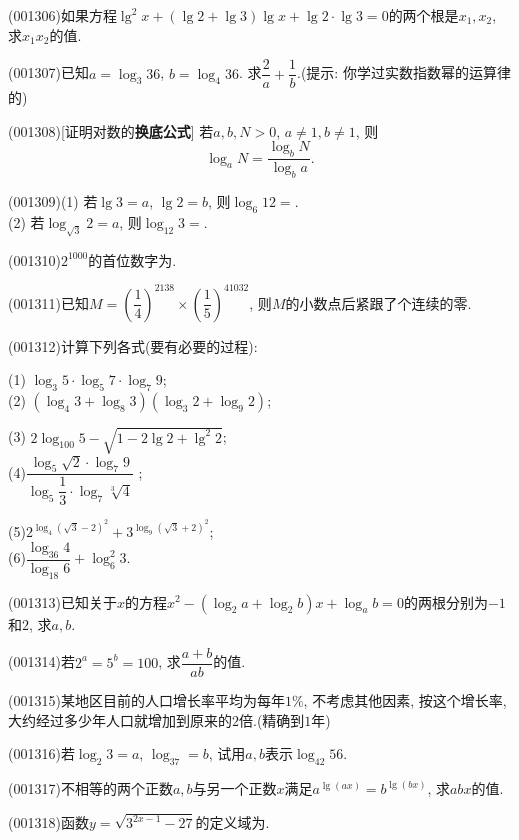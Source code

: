 \item (001306)如果方程$\lg^2x+(\lg2+\lg3)\lg x+\lg2\cdot\lg3=0$的两个根是$x_1,x_2$, 求$x_1x_2$的值.
\item (001307)已知$a=\log_3 36$, $b=\log_4 36$. 求$\dfrac{2}{a}+\dfrac{1}{b}$.(提示: 你学过实数指数幂的运算律的)
\item (001308)[证明对数的{\bf 换底公式}]
若$a,b,N>0$, $a\ne 1, b\ne 1$, 则
$$\log_aN=\dfrac{\log_b N}{\log_b a}.$$
\item (001309)(1) 若$\lg 3=a$, $\lg 2=b$, 则$\log_6 12=$.\\ 
(2) 若$\log_{\sqrt{3}} 2=a$, 则$\log_{12} 3=$.
\item (001310)$2^{1000}$的首位数字为.
\item (001311)已知$M=(\dfrac{1}{4})^{2138}\times(\dfrac{1}{5})^{41032}$, 则$M$的小数点后紧跟了个连续的零.
\item (001312)计算下列各式(要有必要的过程):\\ 
\begin{multicols}{2}
(1) $\log_3 5\cdot\log_5 7\cdot\log_7 9$; \\ 
(2) $(\log_4 3+\log_8 3)(\log_3 2+\log_9 2)$;\\ 
\end{multicols}
\begin{multicols}{2}
(3) $2\log_{100} 5-\sqrt{1-2\lg2+\lg^2 2}$; \\ 
(4)$\dfrac{\log_5 \sqrt{2}\cdot\log_7 9}{\log_5\dfrac{1}{3}\cdot\log_7\sqrt[3]{4}}$ ;
\end{multicols}
\begin{multicols}{2}
(5)$2^{\log_4(\sqrt{3}-2)^2}+3^{\log_9(\sqrt{3}+2)^2}$;  \\ 
(6)$\dfrac{\log_{36}4}{\log_{18}6}+\log_6^2 3$.\\ 
\end{multicols}
\item (001313)已知关于$x$的方程$x^2-(\log_2 a+\log_2 b)x+\log_a b=0$的两根分别为$-1$和$2$, 求$a,b$.
\item (001314)若$2^a=5^b=100$, 求$\dfrac{a+b}{ab}$的值.
\item (001315)某地区目前的人口增长率平均为每年$1\%$, 不考虑其他因素, 按这个增长率, 大约经过多少年人口就增加到原来的$2$倍.(精确到$1$年)
\item (001316)若$\log_2 3=a$, $\log_37=b$, 试用$a,b$表示$\log_{42} 56$.
\item (001317)不相等的两个正数$a,b$与另一个正数$x$满足$a^{\lg(ax)}=b^{\lg(bx)}$, 求$abx$的值.
\item (001318)函数$y=\sqrt{3^{2x-1}-27}$的定义域为.
